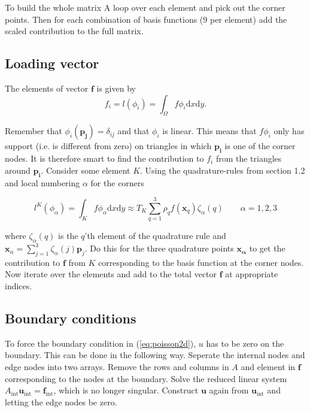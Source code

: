 \documentclass[paper=a4, fontsize=11pt]{scrartcl} %
\begin{document}
To build the whole matrix A loop over each element and pick out the corner points. Then for each combination of basis functions (9 per element) add the scaled contribution to the full matrix.

\subsection{Loading vector}
The elements of vector $\mathbf{f}$ is given by
\[ f_i = l(\phi_i) = \int_{\Omega}f\phi_i\mathrm{d}x\mathrm{d}y.\]

Remember that $\phi_i(\mathbf{p_j})=\delta_{ij}$ and that $\phi_i$ is linear. This means that $f\phi_i$ only has support (i.e. is different from zero) on triangles in which $\mathbf{p_i}$ is one of the corner nodes. It is therefore smart to find the contribution to $f_i$ from the triangles around $\mathbf{p_i}$. Consider some element $K$. Using the quadrature-rules from section 1.2 and local numbering $\alpha$ for the corners 

\[ l^{K}(\phi_\alpha) = \int_{K}f\phi_\alpha\mathrm{d}x\mathrm{d}y \approx T_K \sum\limits^{3}_{q=1} \rho_q f(\mathbf{x}_q)\zeta_\alpha(q) \qquad \alpha =1,2,3\]

where $\zeta_\alpha(q)$ is the $q$'th element of the quadrature rule and $\mathbf{x}_\alpha=\sum^3_{j=1}\zeta_\alpha(j)\mathbf{p}_j$. Do this for the three quadrature points $\mathbf{x_\alpha}$ to get the contribution to $\mathbf{f}$ from $K$ corresponding to the basis function at the corner nodes. Now iterate over the elements and add to the total vector $\mathbf{f}$ at appropriate indices.
\subsection{Boundary conditions}
To force the boundary condition in (\ref{eq:poisson2d}), $u$ has to be zero on the boundary. This can be done in the following way. Seperate the internal nodes and edge nodes into two arrays. Remove the rows and columns in $A$ and element in $\mathbf{f}$ corresponding to the nodes at the boundary. Solve the reduced linear system $A_\mathrm{int}\mathbf{u}_\mathrm{int}=\mathbf{f}_\mathrm{int}$, which is no longer singular. Construct $\mathbf{u}$ again from $\mathbf{u}_\mathrm{int}$ and letting the edge nodes be zero.  
\end{document}
